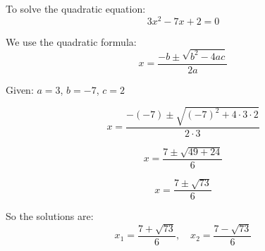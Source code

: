 \documentclass{article}
\begin{document}
To solve the quadratic equation:
\[
3x^2 - 7x + 2 = 0
\]

We use the quadratic formula:
\[
x = \frac{-b \pm \sqrt{b^2 - 4ac}}{2a}
\]

Given: \(a = 3\), \(b = -7\), \(c = 2\)

\[
x = \frac{-(-7) \pm \sqrt{(-7)^2 + 4 \cdot 3 \cdot 2}}{2 \cdot 3}
\]

\[
x = \frac{7 \pm \sqrt{49 + 24}}{6}
\]

\[
x = \frac{7 \pm \sqrt{73}}{6}
\]

So the solutions are:
\[
x_1 = \frac{7 + \sqrt{73}}{6}, \quad x_2 = \frac{7 - \sqrt{73}}{6}
\]
\end{document}
